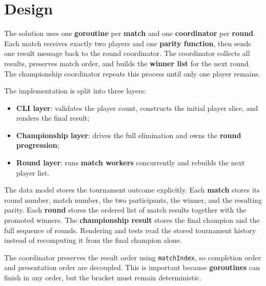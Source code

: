 \section{Design}

The solution uses one \textbf{goroutine} per \textbf{match} and one \textbf{coordinator} per \textbf{round}.
Each match receives exactly two players and one \textbf{parity function}, then sends one result message back to the round coordinator.
The coordinator collects all results, preserves match order, and builds the \textbf{winner list} for the next round.
The championship coordinator repeats this process until only one player remains.

The implementation is split into three layers:
\begin{itemize}
    \item \textbf{CLI layer}: validates the player count, constructs the initial player slice, and renders the final result;
    \item \textbf{Championship layer}: drives the full elimination and owns the \textbf{round progression};
    \item \textbf{Round layer}: runs \textbf{match workers} concurrently and rebuilds the next player list.
\end{itemize}

The data model stores the tournament outcome explicitly.
Each \textbf{match} stores its round number, match number, the two participants, the winner, and the resulting parity.
Each \textbf{round} stores the ordered list of match results together with the promoted winners.
The \textbf{championship result} stores the final champion and the full sequence of rounds.
Rendering and tests read the stored tournament history instead of recomputing it from the final champion alone.

The coordinator preserves the result order using \texttt{matchIndex}, so completion order and presentation order are
decoupled. This is important because \textbf{goroutines} can finish in any order, but the bracket must remain
deterministic.
